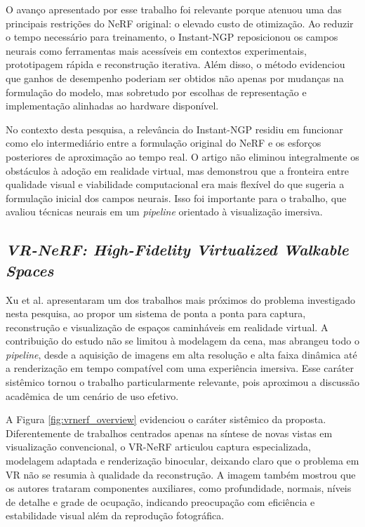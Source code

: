O avanço apresentado por esse trabalho foi relevante porque atenuou uma das principais restrições do NeRF original: o elevado custo de otimização. Ao reduzir o tempo necessário para treinamento, o Instant-NGP reposicionou os campos neurais como ferramentas mais acessíveis em contextos experimentais, prototipagem rápida e reconstrução iterativa. Além disso, o método evidenciou que ganhos de desempenho poderiam ser obtidos não apenas por mudanças na formulação do modelo, mas sobretudo por escolhas de representação e implementação alinhadas ao hardware disponível.

No contexto desta pesquisa, a relevância do Instant-NGP residiu em funcionar como elo intermediário entre a formulação original do NeRF e os esforços posteriores de aproximação ao tempo real. O artigo não eliminou integralmente os obstáculos à adoção em realidade virtual, mas demonstrou que a fronteira entre qualidade visual e viabilidade computacional era mais flexível do que sugeria a formulação inicial dos campos neurais. Isso foi importante para o trabalho, que avaliou técnicas neurais em um \textit{pipeline} orientado à visualização imersiva.

\subsection{\textit{VR-NeRF: High-Fidelity Virtualized Walkable Spaces}}

Xu et al. \cite{xu2023} apresentaram um dos trabalhos mais próximos do problema investigado nesta pesquisa, ao propor um sistema de ponta a ponta para captura, reconstrução e visualização de espaços caminháveis em realidade virtual. A contribuição do estudo não se limitou à modelagem da cena, mas abrangeu todo o \textit{pipeline}, desde a aquisição de imagens em alta resolução e alta faixa dinâmica até a renderização em tempo compatível com uma experiência imersiva. Esse caráter sistêmico tornou o trabalho particularmente relevante, pois aproximou a discussão acadêmica de um cenário de uso efetivo.

A Figura \ref{fig:vrnerf_overview} evidenciou o caráter sistêmico da proposta. Diferentemente de trabalhos centrados apenas na síntese de novas vistas em visualização convencional, o VR-NeRF articulou captura especializada, modelagem adaptada e renderização binocular, deixando claro que o problema em VR não se resumia à qualidade da reconstrução. A imagem também mostrou que os autores trataram componentes auxiliares, como profundidade, normais, níveis de detalhe e grade de ocupação, indicando preocupação com eficiência e estabilidade visual além da reprodução fotográfica.

